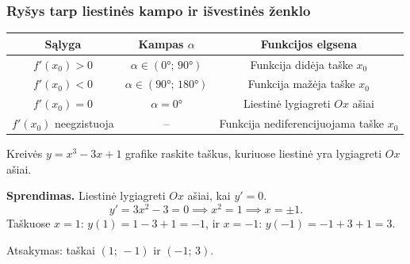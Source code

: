 \begin{center}
\end{center}

\subsubsection*{Ryšys tarp liestinės kampo ir išvestinės ženklo}

\begin{center}
\begin{tabular}{|c|c|c|}
\hline
\textbf{Sąlyga} & \textbf{Kampas} $\alpha$ & \textbf{Funkcijos elgsena} \\
\hline
$f'(x_0) > 0$ & $\alpha \in \left(0°;\,90°\right)$ & Funkcija didėja taške $x_0$ \\
$f'(x_0) < 0$ & $\alpha \in \left(90°;\,180°\right)$ & Funkcija mažėja taške $x_0$ \\
$f'(x_0) = 0$ & $\alpha = 0°$ & Liestinė lygiagreti $Ox$ ašiai \\
$f'(x_0)$ neegzistuoja & – & Funkcija nediferencijuojama taške $x_0$ \\
\hline
\end{tabular}
\end{center}

\begin{exercise}
Kreivės $y = x^3 - 3x + 1$ grafike raskite taškus, kuriuose liestinė yra lygiagreti $Ox$ ašiai.

\textbf{Sprendimas.} Liestinė lygiagreti $Ox$ ašiai, kai $y' = 0$.
\[
y' = 3x^2 - 3 = 0 \implies x^2 = 1 \implies x = \pm 1.
\]
Taškuose $x = 1$: $y(1) = 1 - 3 + 1 = -1$, ir $x = -1$: $y(-1) = -1 + 3 + 1 = 3$.

Atsakymas: taškai $(1;\,-1)$ ir $(-1;\,3)$.
\end{exercise}

